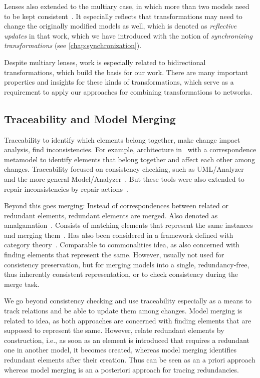 Lenses also extended to the multiary case, in which more than two models need to be kept consistent~\cite{diskin2018MultiModelSynchronization-FASE}.
It especially reflects that transformations may need to change the originally modified models as well, which is denoted as \emph{reflective updates} in that work, which we have introduced with the notion of \emph{synchronizing transformations} (see \autoref{chap:synchronization}).

Despite multiary lenses, work is especially related to bidirectional transformations, which build the basis for our work. There are many important properties and insights for these kinds of transformations, which serve as a requirement to apply our approaches for combining transformations to networks.


\subsection{Traceability and Model Merging}

Traceability to identify which elements belong together, make change impact analysis, find inconsistencies.
For example, architecture in~\cite{szabo2013traceabilityConsistency-ASWEC} with a correspondence metamodel to identify elements that belong together and affect each other among changes.
Traceability focused on consistency checking, such as UML/Analyzer~\cite{egyed2006umlanalyzer-ICSE} and the more general Model/Analyzer~\cite{egyed2011modelanalyzer-TSE}.
But these tools were also extended to repair inconsistencies by repair actions~\cite{reder2012resolvingInconsistencies-ASE}.

Beyond this goes merging: Instead of correspondences between related or redundant elements, redundant elements are merged.
Also denoted as amalgamation~\cite{koenig2017efficientConsistencyChecking-ECMFA}.
Consists of matching elements that represent the same instances and merging them~\cite{koenig2017efficientConsistencyChecking-ECMFA}.
Has also been considered in a framework defined with category theory~\cite{diskin2010overlapsHeterogeneous-MDI}.
Comparable to commonalities idea, as also concerned with finding elements that represent the same. However, usually not used for consistency preservation, but for merging models into a single, redundancy-free, thus inherently consistent representation, or to check consistency during the merge task.

We go beyond consistency checking and use traceability especially as a means to track relations and be able to update them among changes.
Model merging is related to \commonalities idea, as both approaches are concerned with finding elements that are supposed to represent the same. However, \commonalities relate redundant elements by construction, i.e., as soon as an element is introduced that requires a redundant one in another model, it becomes created, whereas model merging identifies redundant elements after their creation. Thus \commonalities can be seen as an a priori approach whereas model merging is an a posteriori approach for tracing redundancies.



